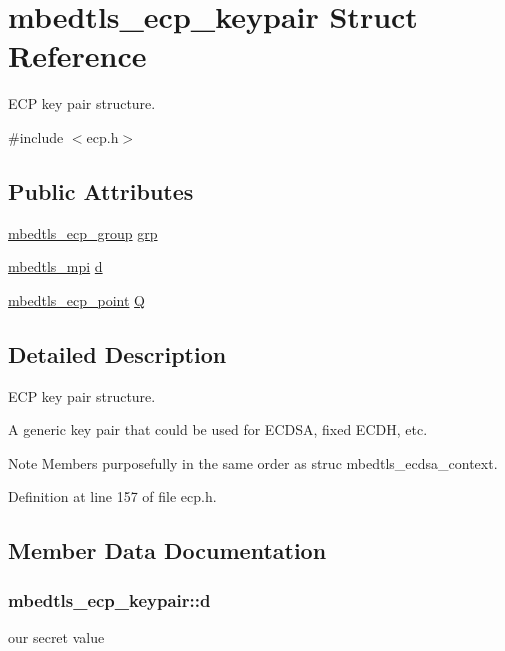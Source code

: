 \hypertarget{structmbedtls__ecp__keypair}{\section{mbedtls\-\_\-ecp\-\_\-keypair Struct Reference}
\label{structmbedtls__ecp__keypair}
}


E\-C\-P key pair structure.  




{\ttfamily \#include $<$ecp.\-h$>$}

\subsection*{Public Attributes}
\begin{DoxyCompactItemize}
\item 
\hyperlink{structmbedtls__ecp__group}{mbedtls\-\_\-ecp\-\_\-group} \hyperlink{structmbedtls__ecp__keypair_ab5b77c1c63b7396b6869545b121d8828}{grp}
\item 
\hyperlink{structmbedtls__mpi}{mbedtls\-\_\-mpi} \hyperlink{structmbedtls__ecp__keypair_aa3d38ffe795a2953fb283644845087d6}{d}
\item 
\hyperlink{structmbedtls__ecp__point}{mbedtls\-\_\-ecp\-\_\-point} \hyperlink{structmbedtls__ecp__keypair_a30cb41708701bb9ed9bdba5972a2ccea}{Q}
\end{DoxyCompactItemize}


\subsection{Detailed Description}
E\-C\-P key pair structure. 

A generic key pair that could be used for E\-C\-D\-S\-A, fixed E\-C\-D\-H, etc.

\begin{DoxyNote}{Note}
Members purposefully in the same order as struc mbedtls\-\_\-ecdsa\-\_\-context. 
\end{DoxyNote}


Definition at line 157 of file ecp.\-h.



\subsection{Member Data Documentation}
\hypertarget{structmbedtls__ecp__keypair_aa3d38ffe795a2953fb283644845087d6}{
\subsubsection[{d}]{ mbedtls\-\_\-ecp\-\_\-keypair\-::d}}\label{structmbedtls__ecp__keypair_aa3d38ffe795a2953fb283644845087d6}
our secret value 

